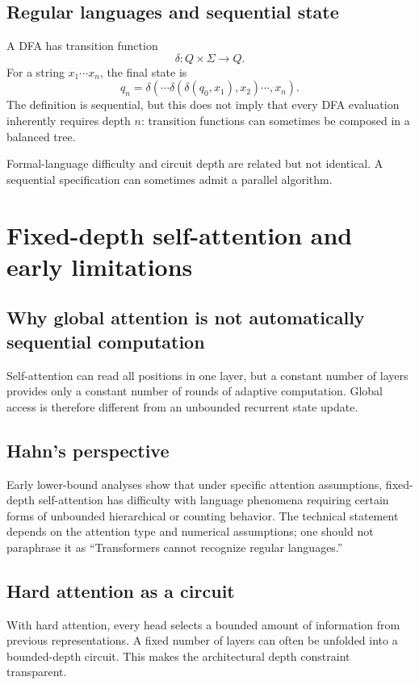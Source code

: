 \documentclass[11pt,a4paper,oneside,openany]{memoir}
\theoremstyle{definition}
\begin{document}
\section{Regular languages and sequential state}
A DFA has transition function
\[
\delta:Q\times\Sigma\to Q.
\]
For a string $x_1\cdots x_n$, the final state is
\[
q_n=\delta(\cdots\delta(\delta(q_0,x_1),x_2)\cdots,x_n).
\]
The definition is sequential, but this does not imply that every DFA evaluation inherently requires depth $n$: transition functions can sometimes be composed in a balanced tree.

\begin{presentbox}
Formal-language difficulty and circuit depth are related but not identical.  A sequential specification can sometimes admit a parallel algorithm.
\end{presentbox}

\chapter{Fixed-depth self-attention and early limitations}
\section{Why global attention is not automatically sequential computation}
Self-attention can read all positions in one layer, but a constant number of layers provides only a constant number of rounds of adaptive computation.  Global access is therefore different from an unbounded recurrent state update.

\section{Hahn's perspective}
Early lower-bound analyses show that under specific attention assumptions, fixed-depth self-attention has difficulty with language phenomena requiring certain forms of unbounded hierarchical or counting behavior.  The technical statement depends on the attention type and numerical assumptions; one should not paraphrase it as ``Transformers cannot recognize regular languages.''

\section{Hard attention as a circuit}
With hard attention, every head selects a bounded amount of information from previous representations.  A fixed number of layers can often be unfolded into a bounded-depth circuit.  This makes the architectural depth constraint transparent.
\end{document}
